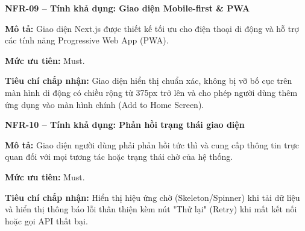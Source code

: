 \documentclass[a4paper]{article}
\begin{document}
\noindent\textbf{NFR-09 – Tính khả dụng: Giao diện Mobile-first \& PWA}\par\nopagebreak
\begin{list}{}{%
    \setlength{\leftmargin}{0.8cm}%
    \setlength{\rightmargin}{0pt}%
    \setlength{\labelwidth}{0pt}%
    \setlength{\labelsep}{0pt}%
    \setlength{\itemindent}{0pt}%
    \setlength{\listparindent}{0pt}%
    \setlength{\itemsep}{5pt}%
    \setlength{\parsep}{0pt}%
    \setlength{\topsep}{5pt}%
}
\item[] \textbf{Mô tả:} Giao diện Next.js được thiết kế tối ưu cho điện thoại di động và hỗ trợ các tính năng Progressive Web App (PWA).
\item[] \textbf{Mức ưu tiên:} Must.
\item[] \textbf{Tiêu chí chấp nhận:} Giao diện hiển thị chuẩn xác, không bị vỡ bố cục trên màn hình di động có chiều rộng từ 375px trở lên và cho phép người dùng thêm ứng dụng vào màn hình chính (Add to Home Screen).
\end{list}

\par\ifdim\dimexpr\pagegoal-\pagetotal\relax<6\baselineskip\newpage\fi
{}

\noindent\textbf{NFR-10 – Tính khả dụng: Phản hồi trạng thái giao diện}\par\nopagebreak
\begin{list}{}{%
    \setlength{\leftmargin}{0.8cm}%
    \setlength{\rightmargin}{0pt}%
    \setlength{\labelwidth}{0pt}%
    \setlength{\labelsep}{0pt}%
    \setlength{\itemindent}{0pt}%
    \setlength{\listparindent}{0pt}%
    \setlength{\itemsep}{5pt}%
    \setlength{\parsep}{0pt}%
    \setlength{\topsep}{5pt}%
}
\item[] \textbf{Mô tả:} Giao diện người dùng phải phản hồi tức thì và cung cấp thông tin trực quan đối với mọi tương tác hoặc trạng thái chờ của hệ thống.
\item[] \textbf{Mức ưu tiên:} Must.
\item[] \textbf{Tiêu chí chấp nhận:} Hiển thị hiệu ứng chờ (Skeleton/Spinner) khi tải dữ liệu và hiển thị thông báo lỗi thân thiện kèm nút "Thử lại" (Retry) khi mất kết nối hoặc gọi API thất bại.
\end{list}

\par\ifdim\dimexpr\pagegoal-\pagetotal\relax<6\baselineskip\newpage\fi
{}
\end{document}
